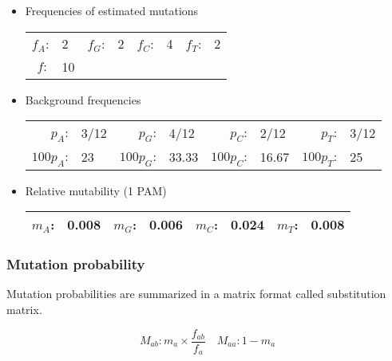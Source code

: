 \begin{itemize}

\item Frequencies of estimated mutations

\begin{table}[H]
\centering
\begin{tabular}{|rl|rl|rl|rl|}
\hline
$f_A$: & 2  & $f_G$: & 2 & $f_C$: & 4 & $f_T$: & 2  \\ \arrayrulecolor{lightgray} \hline \arrayrulecolor{black} 
$f:$ & 10 &   &   &  &   &  &   \\ \hline
\end{tabular}
\end{table}

\item Background frequencies

\begin{table}[H]
\centering
\begin{tabular}{|rl|rl|rl|rl|}
\hline
$p_A$: & 3/12  & $p_G$: & 4/12 & $p_C$: & 2/12 & $p_T$: & 3/12 \\ \arrayrulecolor{lightgray} \hline \arrayrulecolor{black} 
$100p_A$: & 23  & $100p_G$:  & 33.33  & $100p_C$:  & 16.67 & $100p_T$: & 25   \\ \hline
\end{tabular}
\end{table}

\item Relative mutability (1 PAM)

\begin{table}[H]
\centering
\begin{tabular}{|rl|rl|rl|rl|}
\hline
$m_A$: & 0.008  & $m_G$: & 0.006 & $m_C$: & 0.024 & $m_T$: & 0.008 \\ \hline
\end{tabular}
\end{table}

\end{itemize}

%
%
\subsubsection*{Mutation probability}
Mutation probabilities are summarized in a matrix format called substitution matrix.

\[
M_{ab} : m_{a} \times \dfrac{f_{ab}}{f_a} \quad M_{aa} : 1 - m_{a}
\]

%
%
